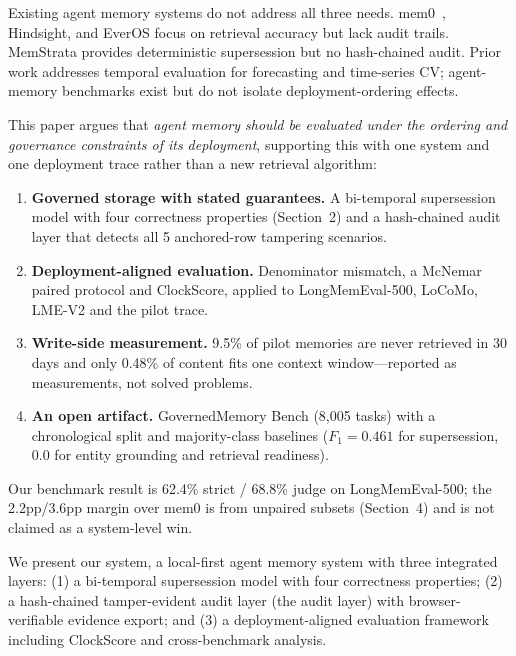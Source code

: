 \documentclass{llncs}
\begin{document}
Existing agent memory systems do not address all three needs. mem0~\cite{mem0}, Hindsight, and EverOS focus on retrieval accuracy but lack audit trails. MemStrata provides deterministic supersession but no hash-chained audit. Prior work addresses temporal evaluation for forecasting and time-series CV; agent-memory benchmarks exist but do not isolate deployment-ordering effects.

This paper argues that \emph{agent memory should be evaluated under the ordering and governance constraints of its deployment}, supporting this with one system and one deployment trace rather than a new retrieval algorithm: \begin{enumerate} \item \textbf{Governed storage with stated guarantees.} A bi-temporal supersession model with four correctness properties (Section~2) and a hash-chained audit layer that detects all 5 anchored-row tampering scenarios. \item \textbf{Deployment-aligned evaluation.} Denominator mismatch, a McNemar paired protocol and ClockScore, applied to LongMemEval-500, LoCoMo, LME-V2 and the pilot trace. \item \textbf{Write-side measurement.} 9.5\% of pilot memories are never retrieved in 30 days and only 0.48\% of content fits one context window---reported as measurements, not solved problems. \item \textbf{An open artifact.} GovernedMemory Bench (8{,}005 tasks) with a chronological split and majority-class baselines ($F_1{=}0.461$ for supersession, 0.0 for entity grounding and retrieval readiness). \end{enumerate} Our benchmark result is 62.4\% strict / 68.8\% judge on LongMemEval-500; the 2.2pp/3.6pp margin over mem0 is from unpaired subsets (Section~4) and is not claimed as a system-level win.

We present our system, a local-first agent memory system with three integrated layers: (1) a bi-temporal supersession model with four correctness properties; (2) a hash-chained tamper-evident audit layer (the audit layer) with browser-verifiable evidence export; and (3) a deployment-aligned evaluation framework including ClockScore and cross-benchmark analysis.
\end{document}
